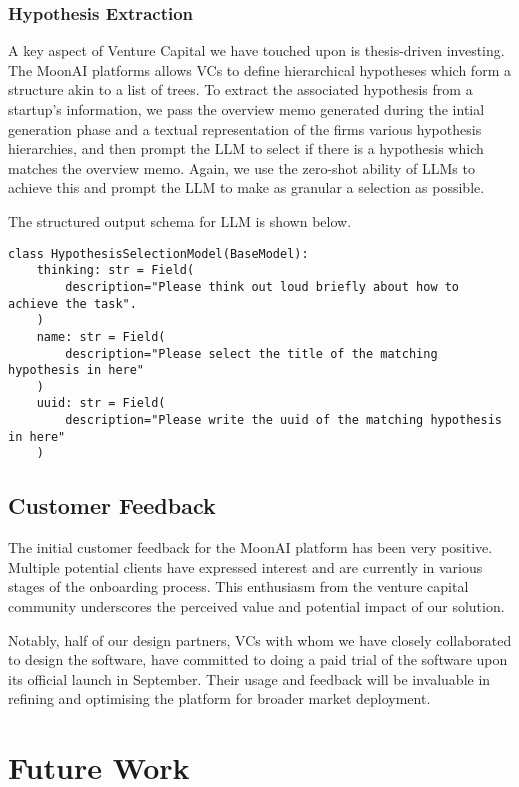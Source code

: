 \documentclass[a4paper, oneside]{discothesis}
\begin{document}
\subsubsection{Hypothesis Extraction}
A key aspect of Venture Capital we have touched upon is thesis-driven investing. The MoonAI platforms allows VCs to define hierarchical hypotheses which form a structure akin to a list of trees. To extract the associated hypothesis from a startup's information, we pass the overview memo generated during the intial generation phase and a textual representation of the firms various hypothesis hierarchies, and then prompt the LLM to select if there is a hypothesis which matches the overview memo. Again, we use the zero-shot  ability of LLMs to achieve this and prompt the LLM to make as granular a selection as possible. 

The structured output schema for LLM is shown below.

\begin{verbatim}
class HypothesisSelectionModel(BaseModel):
    thinking: str = Field(
        description="Please think out loud briefly about how to achieve the task".
    )
    name: str = Field(
        description="Please select the title of the matching hypothesis in here"
    )
    uuid: str = Field(
        description="Please write the uuid of the matching hypothesis in here"
    )
\end{verbatim}

\subsection{Customer Feedback}

The initial customer feedback for the MoonAI platform has been very positive. Multiple potential clients have expressed interest and are currently in various stages of the onboarding process. This enthusiasm from the venture capital community underscores the perceived value and potential impact of our solution.

Notably, half of our design partners, VCs with whom we have closely collaborated to design the software, have committed to doing a paid trial of the software upon its official launch in September. Their usage and feedback will be invaluable in refining and optimising the platform for broader market deployment.

\section{Future Work}
\end{document}
